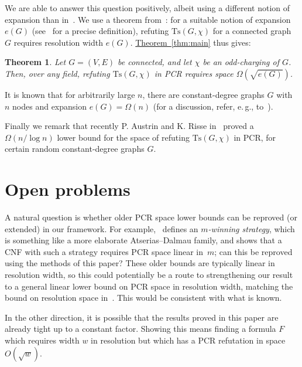 \documentclass[11pt]{article}
\numberwithin{equation}{section}
\newtheorem{theorem}{Theorem}[section]
\theoremstyle{definition}
\theoremstyle{plain}
\newcommand{\eg}{e.\,g.}
\newcommand{\expref}[2]{\hyperref[#2]{#1~\ref{#2}}}
\newcommand\Tse{\mathrm{Ts}}
\begin{document}
We are able to answer this question positively, albeit using a different notion of expansion than 
in~\cite{DBLP:conf/icalp/FilmusLMNV13}. 
We use a theorem from~\cite{DBLP:journals/jacm/Ben-SassonW01}:
for a suitable notion of expansion $e(G)$ (see~\cite{DBLP:journals/jacm/Ben-SassonW01} for a precise definition),
refuting $\Tse(G,\chi)$ for a connected graph $G$ requires resolution width $e(G)$.
 \expref{Theorem}{thm:main} thus gives:

\begin{theorem} Let $G = (V, E)$ be connected, and let $\chi$ be an odd-charging of $G$.
Then, over any field, refuting $\Tse(G, \chi)$ in PCR requires space $\Omega(\sqrt{e(G)})$.
\end{theorem}

It is known that for arbitrarily large $n$, there are constant-degree graphs $G$ with $n$ nodes
and expansion \mbox{$e(G) = \Omega(n)$} (for a discussion, refer, \eg,  to~\cite{DBLP:journals/jacm/Urquhart87}).

Finally we remark that recently  P. Austrin and K. Risse  in~\cite{DBLP:conf/soda/AustrinR22} 
 proved a $\Omega(n/\log n)$ lower bound for the space of refuting  $\Tse(G, \chi)$ in PCR, 
 for certain random constant-degree graphs $G$. 


%
\section{Open problems} \label{sec:open}
%

A natural question is whether older PCR space lower bounds
can be reproved (or extended) in our framework.
For example,~\cite{DBLP:journals/jacm/BonacinaG15}
defines an \emph{$m$-winning strategy}, which is something
like a more elaborate Atserias--Dalmau family, and 
shows that a CNF with such a strategy requires PCR space linear in~$m$;
can this be reproved using the methods of this paper? 
These older bounds are typically linear in resolution width, so this
could potentially be a route to strengthening our result to 
a general linear lower bound on PCR space in resolution width,
matching the bound on resolution space in~\cite{DBLP:journals/jcss/AtseriasD08}.
This would be consistent with what is known.

In the other direction, it is possible that the results proved
in this paper are already tight up to a constant factor.
Showing this means finding
 a formula $F$ which requires width $w$ in resolution but which has  a PCR refutation in
space $O(\sqrt{w})$.
\end{document}
